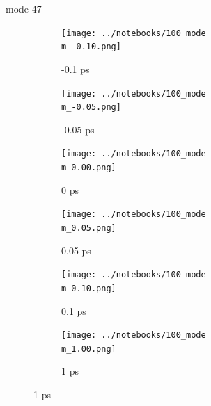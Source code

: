 \documentclass{beamer}
\newcommand\w{0.32}
\begin{document}
\renewcommand\m{47}
\begin{frame}{mode \m}
	\begin{figure}
		\centering
		\begin{subfigure}[b]{\w\textwidth}
			\centering
			\texttt{[image: ../notebooks/100\_mode\\m\_-0.10.png]}
			\caption{-0.1 ps}
		\end{subfigure}
		\begin{subfigure}[b]{\w\textwidth}
			\centering
			\texttt{[image: ../notebooks/100\_mode\\m\_-0.05.png]}
			\caption{-0.05 ps}
		\end{subfigure}
		\begin{subfigure}[b]{\w\textwidth}
			\centering
			\texttt{[image: ../notebooks/100\_mode\\m\_0.00.png]}
			\caption{0 ps}
		\end{subfigure}
		\begin{subfigure}[b]{\w\textwidth}
			\centering
			\texttt{[image: ../notebooks/100\_mode\\m\_0.05.png]}
			\caption{0.05 ps}
		\end{subfigure}
		\begin{subfigure}[b]{\w\textwidth}
			\centering
			\texttt{[image: ../notebooks/100\_mode\\m\_0.10.png]}
			\caption{0.1 ps}
		\end{subfigure}
		\begin{subfigure}[b]{\w\textwidth}
			\centering
			\texttt{[image: ../notebooks/100\_mode\\m\_1.00.png]}
			\caption{1 ps}
		\end{subfigure}
	\end{figure}
\end{frame}

\fi %
\end{document}
